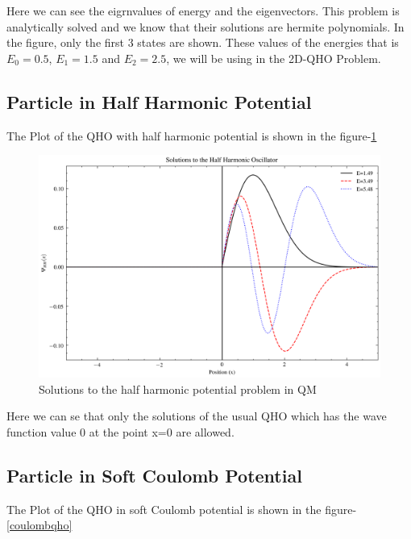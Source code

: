 \documentclass{article}
\begin{document}
\begin{multicols}{2}
Here we can see the eigrnvalues of energy and the eigenvectors. This problem is analytically solved and we know that their solutions are hermite polynomials. In the figure, only the first 3 states are shown. These values of the energies that is $E_0 = 0.5$, $E_1 = 1.5$ and $E_2 = 2.5$, we will be using in the 2D-QHO Problem.




\subsection{Particle in Half Harmonic Potential}

The Plot of the QHO with half harmonic potential is shown in the figure-\ref{halfqho}

\begin{figure}[H]
    \centering
    \includegraphics[width = \columnwidth]{Images/half_harmonic.png}
    \caption{Solutions to the half harmonic potential problem in QM}
    \label{halfqho}
\end{figure}

Here we can se that only the solutions of the usual QHO which has the wave function value 0 at the point x=0 are allowed.


\subsection{Particle in Soft Coulomb Potential}


The Plot of the QHO in soft Coulomb potential is shown in the figure-\ref{coulombqho}


\end{multicols}
\end{document}
